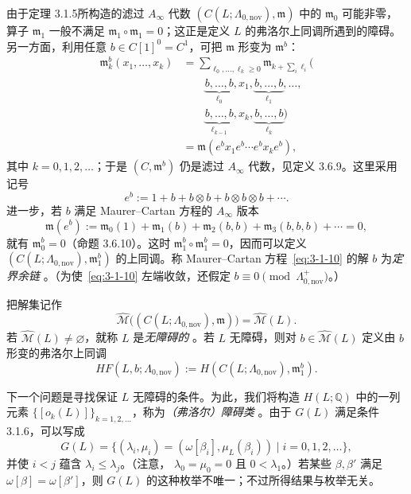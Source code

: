 由于定理 3.1.5所构造的滤过 $A_\infty$ 代数
$(C(L;\Lambda_{0,\mathrm{nov}}),\mathfrak m)$ 中的
$\mathfrak m_0$ 可能非零，算子 $\mathfrak m_1$ 一般不满足
$\mathfrak m_1\circ\mathfrak m_1=0$；这正是定义 $L$ 的弗洛尔上同调所遇到的障碍。另一方面，利用任意
$b\in C[1]^0=C^1$，可把 $\mathfrak m$ 形变为
$\mathfrak m^b$：
\begin{align*}
  \mathfrak m_k^b(x_1,\ldots,x_k)
  &={}
  \sum_{\ell_0,\ldots,\ell_k\geq0}
  \mathfrak m_{k+\sum_i\ell_i}
  \bigl(\\[-0.35em]
  &\qquad
    \underbrace{b,\ldots,b}_{\ell_0},x_1,
    \underbrace{b,\ldots,b}_{\ell_1},\ldots,\\[-0.15em]
  &\qquad
    \underbrace{b,\ldots,b}_{\ell_{k-1}},x_k,
    \underbrace{b,\ldots,b}_{\ell_k}
  \bigr)\\
  &={}
  \mathfrak m(e^b x_1e^b\cdots e^b x_ke^b),
\end{align*}
其中 $k=0,1,2,\ldots$；于是 $(C,\mathfrak m^b)$ 仍是滤过
$A_\infty$ 代数，见定义 3.6.9。这里采用记号
\[
  e^b:=1+b+b\otimes b+b\otimes b\otimes b+\cdots.
\]
进一步，若 $b$ 满足 Maurer--Cartan 方程的 $A_\infty$ 版本
\begin{equation}
  \mathfrak m(e^b):=
  \mathfrak m_0(1)+\mathfrak m_1(b)+\mathfrak m_2(b,b)
  +\mathfrak m_3(b,b,b)+\cdots=0,
  \tag{3.1.10}\label{eq:3-1-10}
\end{equation}
就有 $\mathfrak m_0^b=0$（命题 3.6.10）。这时
$\mathfrak m_1^b\circ\mathfrak m_1^b=0$，因而可以定义
$(C(L;\Lambda_{0,\mathrm{nov}}),\mathfrak m_1^b)$ 的上同调。称
Maurer--Cartan 方程~\eqref{eq:3-1-10} 的解 $b$ 为\emph{定界余链}
。（为使~\eqref{eq:3-1-10} 左端收敛，还假定
$b\equiv0\pmod{\Lambda_{0,\mathrm{nov}}^+}$。）

把解集记作
\[
  \widehat{\mathcal M}
  \bigl((C(L;\Lambda_{0,\mathrm{nov}}),\mathfrak m)\bigr)
  =\widehat{\mathcal M}(L).
\]
若 $\widehat{\mathcal M}(L)\neq\varnothing$，就称 $L$ 是\emph{无障碍的}
。若 $L$ 无障碍，则对
$b\in\widehat{\mathcal M}(L)$ 定义由 $b$ 形变的弗洛尔上同调
\[
  HF(L,b;\Lambda_{0,\mathrm{nov}})
  :=H(C(L;\Lambda_{0,\mathrm{nov}}),\mathfrak m_1^b).
\]

下一个问题是寻找保证 $L$ 无障碍的条件。为此，我们将构造
$H(L;\mathbb Q)$ 中的一列元素
$\{[o_k(L)]\}_{k=1,2,\ldots}$，称为\emph{（弗洛尔）障碍类}
。由于 $G(L)$ 满足条件 3.1.6，可以写成
\[
  G(L)=\bigl\{(\lambda_i,\mu_i)
  =(\omega[\beta_i],\mu_L(\beta_i))\mid i=0,1,2,\ldots\bigr\},
\]
并使 $i<j$ 蕴含 $\lambda_i\leq\lambda_j$。（注意，
$\lambda_0=\mu_0=0$ 且 $0<\lambda_1$。）若某些
$\beta,\beta'$ 满足 $\omega[\beta]=\omega[\beta']$，则 $G(L)$ 的这种枚举不唯一；不过所得结果与枚举无关。

